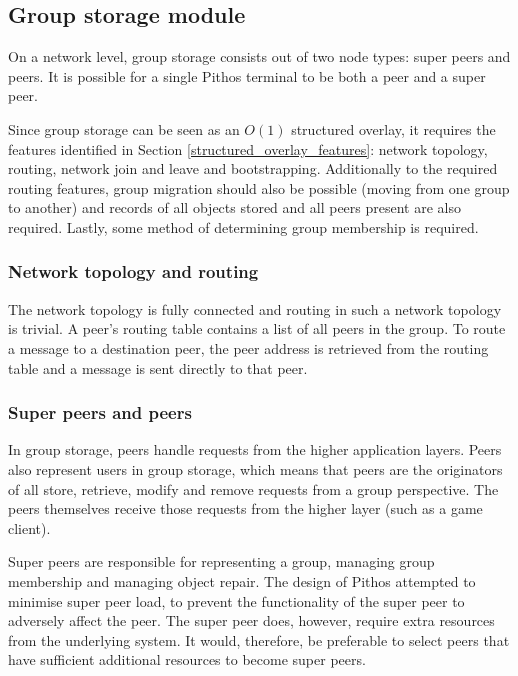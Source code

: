\subsection{Group storage module}

On a network level, group storage consists out of two node types: super peers and peers. It is possible for a single Pithos terminal to be both a peer and a super peer.

Since group storage can be seen as an $O(1)$ structured overlay, it requires the features identified in Section \ref{structured_overlay_features}: network topology, routing, network join and leave and bootstrapping. Additionally to the required routing features, group migration should also be possible (moving from one group to another) and records of all objects stored and all peers present are also required. Lastly, some method of determining group membership is required.

\subsubsection{Network topology and routing}

The network topology is fully connected and routing in such a network topology is trivial. A peer's routing table contains a list of all peers in the group. To route a message to a destination peer, the peer address is retrieved from the routing table and a message is sent directly to that peer.

\subsubsection{Super peers and peers}

In group storage, peers handle requests from the higher application layers. Peers also represent users in group storage, which means that peers are the originators of all store, retrieve, modify and remove requests from a group perspective. The peers themselves receive those requests from the higher layer (such as a game client).

Super peers are responsible for representing a group, managing group membership and managing object repair. The design of Pithos attempted to minimise super peer load, to prevent the functionality of the super peer to adversely affect the peer. The super peer does, however, require extra resources from the underlying system. It would, therefore, be preferable to select peers that have sufficient additional resources to become super peers.

